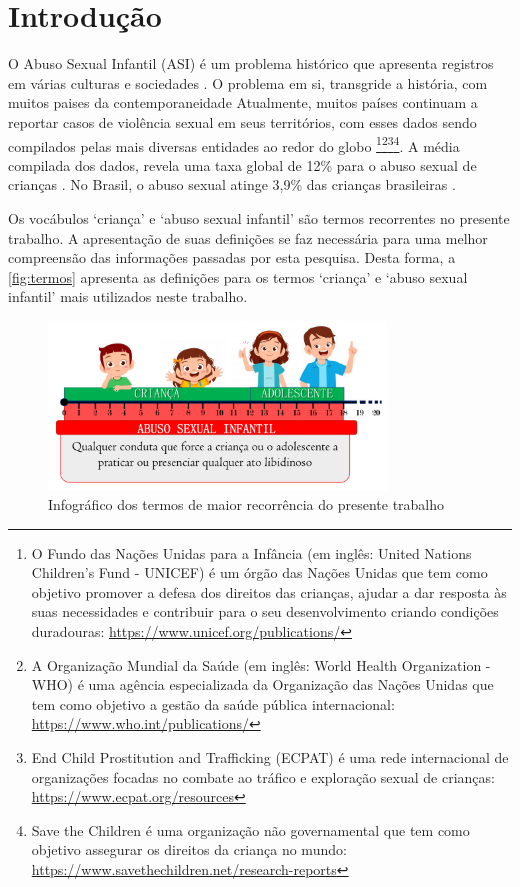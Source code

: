 \chapter{Introdução}\label{Capitulo:Introducao}

O Abuso Sexual Infantil (ASI) é um problema histórico que apresenta registros em várias culturas e sociedades \cite{walker1988physically}. O problema em si, transgride a história, com muitos paises da contemporaneidade 
Atualmente, muitos países continuam a reportar casos de violência sexual em seus territórios, com esses dados sendo compilados pelas mais diversas entidades ao redor do globo \footnote{O Fundo das Nações Unidas para a Infância (em inglês: United Nations Children's Fund - UNICEF) é um órgão das Nações Unidas que tem como objetivo promover a defesa dos direitos das crianças, ajudar a dar resposta às suas necessidades e contribuir para o seu desenvolvimento criando condições duradouras: \url{https://www.unicef.org/publications/}}\footnote{A Organização Mundial da Saúde (em inglês: World Health Organization - WHO) é uma agência especializada da Organização das Nações Unidas que tem como objetivo a gestão da saúde pública internacional: \url{https://www.who.int/publications/}}\footnote{End Child Prostitution and Trafficking (ECPAT) é uma rede internacional de organizações focadas no combate ao tráfico e exploração sexual de crianças: \url{https://www.ecpat.org/resources}}\footnote{Save the Children é uma organização não governamental que tem como objetivo assegurar os direitos da criança no mundo: \url{https://www.savethechildren.net/research-reports}}. A média compilada dos dados, revela uma taxa global de 12\% para o abuso sexual de crianças \cite{stoltenborgh2011global, azzopardi2019meta}. No Brasil, o abuso sexual atinge 3,9\% das crianças brasileiras \cite{bassani2009child}. 

Os vocábulos `criança' e `abuso sexual infantil' são termos recorrentes no presente trabalho. A apresentação de suas definições se faz necessária para uma melhor compreensão das informações passadas por esta pesquisa. Desta forma, a \autoref{fig:termos} apresenta as definições para os termos `criança' e `abuso sexual infantil' mais utilizados neste trabalho.


\begin{figure}[htb]
	\caption{\label{fig:termos}Infográfico dos termos de maior recorrência do presente trabalho}
	\begin{center}
	    \includegraphics[width=0.8\textwidth]{./Figuras/Termos.pdf}
	\end{center}
\end{figure}


